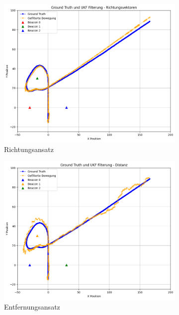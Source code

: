 \documentclass[conference]{IEEEtran}[10pt]
\begin{document}
\begin{figure}
    \begin{subfigure}{.333\textwidth}
        \centering
        \includegraphics[width=.9\linewidth]{Ergebnisse/plots_fahrten/richtung/richtung_dyn_acc_flag_freq.png}
        \caption{Richtungsansatz}
    \end{subfigure}
    \begin{subfigure}{.333\textwidth}
        \centering
        \includegraphics[width=.9\linewidth]{Ergebnisse/plots_fahrten/distanz/distanz_dyn_acc_flag_freq.png}
        \caption{Entfernungsansatz}
    \end{subfigure}
    \begin{subfigure}{.333\textwidth}
        \centering

\end{subfigure}
\end{figure}
\end{document}
